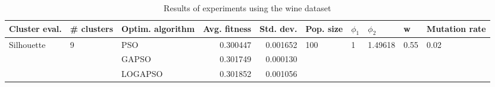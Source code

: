 \begin{table}
\centering
\caption{Results of experiments using the wine dataset}
\begin{tabular}{lllrrlllll}
\toprule
              Cluster eval. &        \# clusters & Optim. algorithm &  Avg. fitness &  Std. dev. &            Pop. size &         $\phi_{1}$ &               $\phi_{2}$ &                     w &         Mutation rate \\
\midrule
\multirow{3}{*}{Silhouette} & \multirow{3}{*}{9} &              PSO &      0.300447 &   0.001652 & \multirow{3}{*}{100} & \multirow{3}{*}{1} & \multirow{3}{*}{1.49618} & \multirow{3}{*}{0.55} & \multirow{3}{*}{0.02} \\
                            &                    &            GAPSO &      0.301749 &   0.000130 &                      &                    &                          &                       &                       \\
                            &                    &          LOGAPSO &      0.301852 &   0.001056 &                      &                    &                          &                       &                       \\
\bottomrule
\end{tabular}
\end{table}
